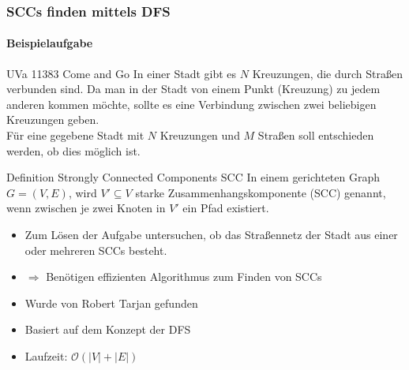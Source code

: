 \begin{frame}
	\frametitle{SCCs finden mittels DFS}
	\framesubtitle{Beispielaufgabe}
	\begin{KITexampleblock}{UVa 11383 Come and Go}
		In einer Stadt gibt es $N$  Kreuzungen, die durch Straßen verbunden sind.
		Da man in der Stadt von einem Punkt (Kreuzung) zu jedem anderen kommen möchte, sollte es eine Verbindung zwischen zwei beliebigen Kreuzungen geben. \\
		Für eine gegebene Stadt mit $N$ Kreuzungen und $M$ Straßen soll entschieden werden, ob dies möglich ist.
			
	\end{KITexampleblock}
	\pause 
	\bigskip
	
	\begin{KITinfoblock}{Definition Strongly Connected Components SCC}
		In einem gerichteten Graph $G = (V,E)$, wird $V' \subseteq V$ starke Zusammenhangskomponente (SCC) genannt, wenn zwischen je zwei Knoten in $V'$ ein Pfad existiert.
	\end{KITinfoblock}
	
	
\end{frame}

\begin{frame}
	\begin{itemize}
		\item Zum Lösen der Aufgabe untersuchen, ob das Straßennetz der Stadt aus einer oder mehreren SCCs besteht.
		\item $\Rightarrow$ Benötigen effizienten Algorithmus zum Finden von SCCs 
	\end{itemize}	
	\pause
	\begin{itemize}
		\item Wurde von Robert Tarjan gefunden
		\item Basiert auf dem Konzept der DFS
		\item Laufzeit: $\mathcal{O}(|V| + |E|)$
	\end{itemize}
\end{frame}
